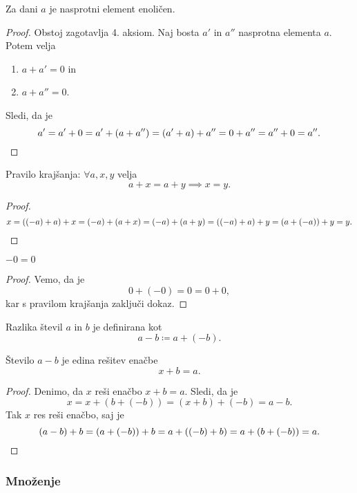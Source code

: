 \documentclass[12pt, a4paper]{article}
\begin{document}
\begin{opomba}\label{o1}
Za dani $a$ je nasprotni element enoličen.
\end{opomba}

\begin{proof}
Obstoj zagotavlja 4. aksiom. Naj bosta $a'$ in $a''$ nasprotna elementa $a$. Potem velja

\begin{enumerate}[label=\roman*)]
\item $a+a'=0$ in
\item $a+a''=0$.
\end{enumerate}

Sledi, da je
\[
a'=a'+0=a'+(a+a'')=(a'+a)+a''=0+a''=a''+0=a''.\qedhere
\]
\end{proof}

\begin{opomba}\label{o2}
Pravilo krajšanja: $\forall a,x,y$ velja
\[
a+x=a+y\implies x=y.
\]
\end{opomba}

\begin{proof}
\[
x=((-a)+a)+x=(-a)+(a+x)=(-a)+(a+y)=((-a)+a)+y=(a+(-a))+y=y.\qedhere
\]
\end{proof}

\begin{posledica}
$-0=0$
\end{posledica}

\begin{proof}
Vemo, da je
\[
0+(-0)=0=0+0,
\]
kar s pravilom krajšanja zaključi dokaz.
\end{proof}

\begin{definicija}
Razlika števil $a$ in $b$ je definirana kot
\[
a-b\coloneqq a+(-b).
\]
\end{definicija}

\begin{posledica}\label{p1}
Število $a-b$ je edina rešitev enačbe
\[
x+b=a.
\]
\end{posledica}

\begin{proof}
Denimo, da $x$ reši enačbo $x+b=a$. Sledi, da je
\[
x=x+(b+(-b))=(x+b)+(-b)=a-b.
\]
Tak $x$ res reši enačbo, saj je
\[
(a-b)+b=(a+(-b))+b=a+((-b)+b)=a+(b+(-b))=a.\qedhere
\]
\end{proof}

\newpage

\subsubsection{Množenje}
\end{document}
